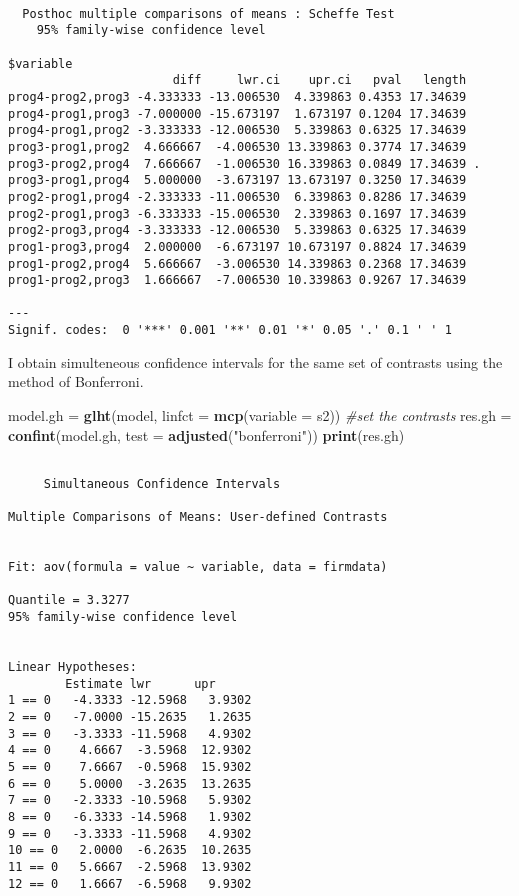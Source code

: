 \documentclass[]{article}
\newenvironment{Shaded}{\begin{snugshade}}{\end{snugshade}}
\newcommand{\KeywordTok}[1]{\textcolor[rgb]{0.13,0.29,0.53}{\textbf{#1}}}
\newcommand{\DataTypeTok}[1]{\textcolor[rgb]{0.13,0.29,0.53}{#1}}
\newcommand{\StringTok}[1]{\textcolor[rgb]{0.31,0.60,0.02}{#1}}
\newcommand{\CommentTok}[1]{\textcolor[rgb]{0.56,0.35,0.01}{\textit{#1}}}
\newcommand{\NormalTok}[1]{#1}
\begin{document}
\begin{verbatim}

  Posthoc multiple comparisons of means : Scheffe Test 
    95% family-wise confidence level

$variable
                       diff     lwr.ci    upr.ci   pval   length    
prog4-prog2,prog3 -4.333333 -13.006530  4.339863 0.4353 17.34639    
prog4-prog1,prog3 -7.000000 -15.673197  1.673197 0.1204 17.34639    
prog4-prog1,prog2 -3.333333 -12.006530  5.339863 0.6325 17.34639    
prog3-prog1,prog2  4.666667  -4.006530 13.339863 0.3774 17.34639    
prog3-prog2,prog4  7.666667  -1.006530 16.339863 0.0849 17.34639 .  
prog3-prog1,prog4  5.000000  -3.673197 13.673197 0.3250 17.34639    
prog2-prog1,prog4 -2.333333 -11.006530  6.339863 0.8286 17.34639    
prog2-prog1,prog3 -6.333333 -15.006530  2.339863 0.1697 17.34639    
prog2-prog3,prog4 -3.333333 -12.006530  5.339863 0.6325 17.34639    
prog1-prog3,prog4  2.000000  -6.673197 10.673197 0.8824 17.34639    
prog1-prog2,prog4  5.666667  -3.006530 14.339863 0.2368 17.34639    
prog1-prog2,prog3  1.666667  -7.006530 10.339863 0.9267 17.34639    

---
Signif. codes:  0 '***' 0.001 '**' 0.01 '*' 0.05 '.' 0.1 ' ' 1
\end{verbatim}

I obtain simulteneous confidence intervals for the same set of contrasts
using the method of Bonferroni.

\begin{Shaded}
\begin{Highlighting}[]
\NormalTok{model.gh =}\StringTok{ }\KeywordTok{glht}\NormalTok{(model, }\DataTypeTok{linfct =} \KeywordTok{mcp}\NormalTok{(}\DataTypeTok{variable =}\NormalTok{ s2))  }\CommentTok{#set the contrasts}
\NormalTok{res.gh =}\StringTok{ }\KeywordTok{confint}\NormalTok{(model.gh, }\DataTypeTok{test =} \KeywordTok{adjusted}\NormalTok{(}\StringTok{"bonferroni"}\NormalTok{))}
\KeywordTok{print}\NormalTok{(res.gh)}
\end{Highlighting}
\end{Shaded}

\begin{verbatim}

     Simultaneous Confidence Intervals

Multiple Comparisons of Means: User-defined Contrasts


Fit: aov(formula = value ~ variable, data = firmdata)

Quantile = 3.3277
95% family-wise confidence level
 

Linear Hypotheses:
        Estimate lwr      upr     
1 == 0   -4.3333 -12.5968   3.9302
2 == 0   -7.0000 -15.2635   1.2635
3 == 0   -3.3333 -11.5968   4.9302
4 == 0    4.6667  -3.5968  12.9302
5 == 0    7.6667  -0.5968  15.9302
6 == 0    5.0000  -3.2635  13.2635
7 == 0   -2.3333 -10.5968   5.9302
8 == 0   -6.3333 -14.5968   1.9302
9 == 0   -3.3333 -11.5968   4.9302
10 == 0   2.0000  -6.2635  10.2635
11 == 0   5.6667  -2.5968  13.9302
12 == 0   1.6667  -6.5968   9.9302
\end{verbatim}
\end{document}
